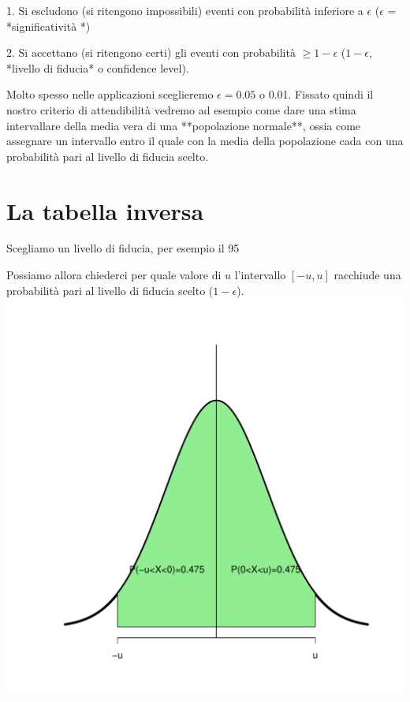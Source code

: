 \documentclass[onecolumn,12pt]{book}\usepackage[]{graphicx}\usepackage[]{color}
\makeatletter
\def\maxwidth{ %
  \ifdim\Gin@nat@width>\linewidth
    \linewidth
  \else
    \Gin@nat@width
  \fi
}
\newenvironment{knitrout}{}{} %
\makeatother
\begin{document}
1. Si escludono (si ritengono impossibili) eventi con probabilità  inferiore a $\epsilon$  ($\epsilon$  =  *significatività *)

2. Si accettano (si ritengono certi) gli eventi con probabilità   $\geq  1-\epsilon$  ($1-\epsilon$, *livello di fiducia*  o confidence level). 

Molto spesso nelle applicazioni sceglieremo $\epsilon  = 0.05$ o 0.01. Fissato quindi il nostro criterio di attendibilità  vedremo ad esempio come dare una stima intervallare della media vera di una **popolazione normale**, ossia come assegnare un intervallo entro il quale con la media della popolazione cada con una probabilità  pari al livello di fiducia scelto.

\section{La tabella inversa}

Scegliamo un livello di fiducia, per esempio il 95%
 
Possiamo allora chiederci per quale valore di $u$  l'intervallo $[-u,u]$ racchiude una probabilità  pari al livello di fiducia scelto 
($1-\epsilon$).
\begin{knitrout}
\color{fgcolor}
\includegraphics[width=\maxwidth]{figure/unnamed-chunk-31-1} 

\end{knitrout}
 
\end{document}
